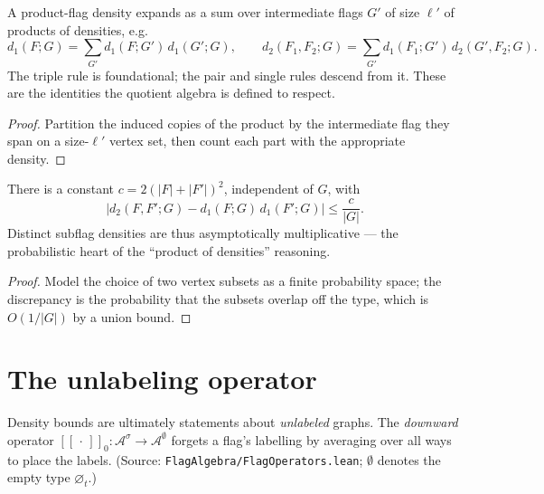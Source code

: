 \begin{theorem}
  \label{thm:density-chain-rules}
  \leanok
  A product-flag density expands as a sum over intermediate flags $G'$ of size
  $\ell'$ of products of densities, e.g.
  \[ d_1(F;G) = \sum_{G'} d_1(F;G')\, d_1(G';G), \qquad
     d_2(F_1,F_2;G) = \sum_{G'} d_1(F_1;G')\, d_2(G',F_2;G). \]
  The triple rule is foundational; the pair and single rules descend from it.
  These are the identities the quotient algebra is defined to respect.
\end{theorem}
\begin{proof}\leanok
  Partition the induced copies of the product by the intermediate flag they span
  on a size-$\ell'$ vertex set, then count each part with the appropriate
  density.
\end{proof}

\begin{theorem}
  \label{thm:density-prod-approx}
  \leanok
  There is a constant $c = 2(|F|+|F'|)^2$, independent of $G$, with
  \[ \bigl| d_2(F,F';G) - d_1(F;G)\, d_1(F';G) \bigr| \le \frac{c}{|G|}. \]
  Distinct subflag densities are thus asymptotically multiplicative --- the
  probabilistic heart of the ``product of densities'' reasoning.
\end{theorem}
\begin{proof}\leanok
  Model the choice of two vertex subsets as a finite probability space; the
  discrepancy is the probability that the subsets overlap off the type, which is
  $O(1/|G|)$ by a union bound.
\end{proof}


\chapter{The unlabeling operator}
\label{chap:downward}

Density bounds are ultimately statements about \emph{unlabeled} graphs. The
\emph{downward} operator $[\![\,\cdot\,]\!]_0 : \mathcal{A}^\sigma \to
\mathcal{A}^\emptyset$ forgets a flag's labelling by averaging over all ways to
place the labels. (Source: \texttt{FlagAlgebra/FlagOperators.lean}; $\emptyset$
denotes the empty type $\varnothing_t$.)

